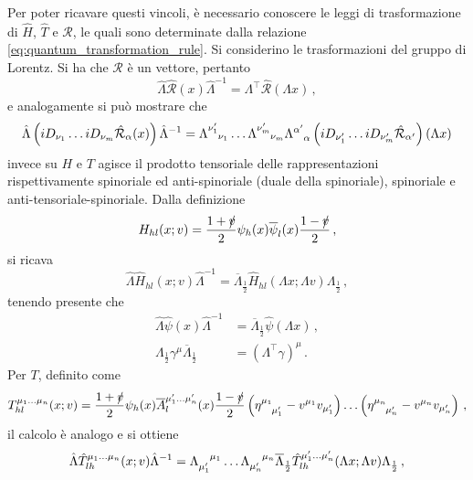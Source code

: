 \documentclass{article}
\newcommand{\adj}[1]{\overline{#1}}
\begin{document}
Per poter ricavare questi vincoli, è necessario conoscere le leggi di trasformazione di $\hat{H}$, $\hat{T}$ e $\hat{\mathcal{R}}$, le quali sono determinate dalla relazione \eqref{eq:quantum_transformation_rule}. Si considerino le trasformazioni del gruppo di Lorentz. Si ha che $\mathcal{R}$ è un vettore, pertanto 
\begin{equation}
  \hat{\Lambda} \hat{\mathcal{R}} (x) \hat{\Lambda}^{-1} = \Lambda^\top \hat{\mathcal{R}}(\Lambda x) \, ,
\end{equation}
e analogamente si può mostrare che
\begin{equation}
  \hat{\Lambda} \left( i D_{\nu_1} \dots i D_{\nu_m} \hat{\mathcal{R}}_\alpha (x) \right) \hat{\Lambda}^{-1} = \Lambda\indices{^{\nu'_1}_{\nu_1}} \dots \Lambda\indices{^{\nu'_m}_{\nu_m}} \Lambda\indices{^{\alpha'}_{\alpha}} \left( i D_{\nu'_1} \dots i D_{\nu'_m} \hat{\mathcal{R}}_{\alpha'} \right) (\Lambda x)
\end{equation}
invece su $H$ e $T$ agisce il prodotto tensoriale delle rappresentazioni rispettivamente spinoriale ed anti-spinoriale (duale della spinoriale), spinoriale e anti-tensoriale-spinoriale. Dalla definizione
\begin{equation}
  H_{h l}(x; v) = \frac{1 + \slashed{v}}{2} \psi_h (x) \adj{\psi}_l (x) \frac{1 - \slashed{v}}{2} \, ,
\end{equation}
si ricava
\begin{equation}
  \hat{\Lambda} \hat{H}_{h l}(x; v) \hat{\Lambda}^{-1} = \adj{\Lambda}_{\frac{1}{2}} \hat{H}_{h l}(\Lambda x; \Lambda v) \Lambda_{\frac{1}{2}} \, ,
\end{equation}
tenendo presente che
\begin{align}
  \hat{\Lambda} \hat{\psi}(x) \hat{\Lambda}^{-1} &= \adj{\Lambda}_{\frac{1}{2}} \hat{\psi}(\Lambda x) \, , \\
  \Lambda_{\frac{1}{2}} \gamma^\mu \adj{\Lambda}_{\frac{1}{2}} &= \left( \Lambda^\top \gamma \right)^\mu \, .
\end{align}
Per $T$, definito come
\begin{equation}
  T_{h l}^{\mu_1 \dots \mu_n} (x; v) = \frac{1 + \slashed{v}}{2} \psi_h (x) \adj{A}^{\mu'_1 \dots \mu'_n}_l (x) \frac{1 - \slashed{v}}{2} \left(\eta\indices{^{\mu_1}_{\mu'_1}} - v^{\mu_1}v_{\mu'_1} \right) \dots \left(\eta\indices{^{\mu_n}_{\mu'_n}} - v^{\mu_n}v_{\mu'_n} \right)\, ,
\end{equation}
il calcolo è analogo e si ottiene
\begin{equation}
  \hat{\Lambda} \hat{T}^{\mu_1 \dots \mu_n}_{l h}(x; v) \hat{\Lambda}^{-1} = \Lambda\indices{_{\mu'_1}^{\mu_1}} \dots \Lambda\indices{_{\mu'_n}^{\mu_n}} \adj{\Lambda}_{\frac{1}{2}} \hat{T}^{\mu'_1 \dots \mu'_n}_{l h}(\Lambda x; \Lambda v ) \Lambda_{\frac{1}{2}} \, ,
\end{equation}
\end{document}
